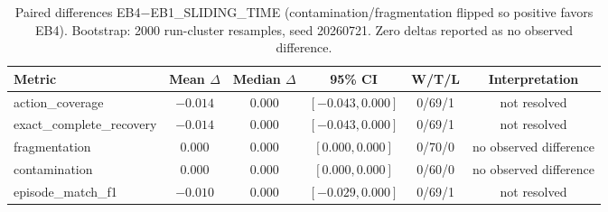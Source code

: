 \begin{table}[!t]
\caption{Paired differences EB4$-$EB1\_SLIDING\_TIME (contamination/fragmentation flipped so positive favors EB4).
Bootstrap: 2000 run-cluster resamples, seed 20260721. Zero deltas reported as no observed difference.}
\label{tab:paired-eb1}
\centering
\small
\setlength{\tabcolsep}{5pt}
\begin{tabular}{@{}lccccc@{}}
\toprule
\textbf{Metric} & \textbf{Mean $\Delta$} & \textbf{Median $\Delta$} & \textbf{95\% CI} & \textbf{W/T/L} & \textbf{Interpretation} \\
\midrule
action\_coverage & $-0.014$ & $0.000$ & $[-0.043,0.000]$ & 0/69/1 & not resolved \\
exact\_complete\_recovery & $-0.014$ & $0.000$ & $[-0.043,0.000]$ & 0/69/1 & not resolved \\
fragmentation & $0.000$ & $0.000$ & $[0.000,0.000]$ & 0/70/0 & no observed difference \\
contamination & $0.000$ & $0.000$ & $[0.000,0.000]$ & 0/60/0 & no observed difference \\
episode\_match\_f1 & $-0.010$ & $0.000$ & $[-0.029,0.000]$ & 0/69/1 & not resolved \\
\bottomrule
\end{tabular}
\end{table}
